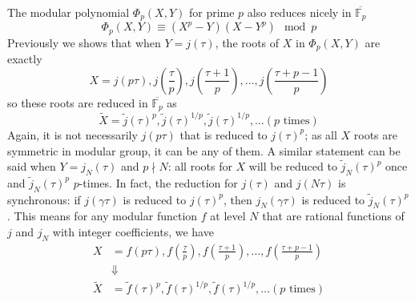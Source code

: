 \documentclass[]{article}
\begin{document}
The modular polynomial $\Phi_p(X, Y)$ for prime $p$ also reduces nicely in $\overline{\mathbb{F}_p}$
\[
\Phi_p(X, Y) \equiv (X^p - Y)(X - Y^p) \mod p
\]
Previously we shows that when $Y = j(\tau)$, the roots of $X$ in $\Phi_p(X, Y)$ are exactly
\[
X = j(p\tau), j\left(\frac{\tau}{p}\right), j\left(\frac{\tau + 1}{p}\right),\dots,j\left(\frac{\tau + p -1}{p}\right)
\]
so these roots are reduced in $\overline{\mathbb{F}_p}$ as
\[
\tilde{X} = \tilde{j}(\tau)^p, \tilde{j}(\tau)^{1/p}, \tilde{j}(\tau)^{1/p},\dots (\mbox{$p$ times})
\]
Again, it is not necessarily $j(p\tau)$ that is reduced to $j(\tau)^p$; as all $X$ roots are symmetric in modular group, it can be any of them. A similar statement can be said when $Y = j_N(\tau)$ and $p \nmid N$: all roots for $X$ will be reduced to $\tilde{j}_N(\tau)^p$ once and $\tilde{j}_N(\tau)^p$ $p$-times. In fact, the reduction for $j(\tau)$ and $j(N\tau)$ is synchronous: if $j(\gamma\tau)$ is reduced to $j(\tau)^p$, then $j_N(\gamma\tau)$ is reduced to $\tilde{j}_N(\tau)^p$. This means for any modular function $f$ at level $N$ that are rational functions of $j$ and $j_N$ with integer coefficients, we have
\begin{align*}
X &= f(p\tau), f\left(\frac{\tau}{p}\right), f\left(\frac{\tau + 1}{p}\right),\dots,f\left(\frac{\tau + p -1}{p}\right)\\
&\Downarrow\\
\tilde{X} &= \tilde{f}(\tau)^p, \tilde{f}(\tau)^{1/p}, \tilde{f}(\tau)^{1/p},\dots (\mbox{$p$ times})
\end{align*}
\end{document}
